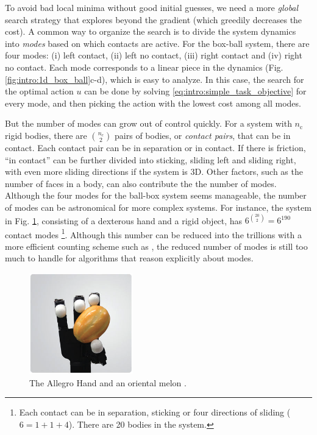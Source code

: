 To avoid bad local minima without good initial guesses, we need a more \emph{global} search strategy that explores beyond the gradient (which greedily decreases the cost). A common way to organize the search is to divide the system dynamics into \emph{modes} based on which contacts are active. For the box-ball system, there are four modes: (i) left contact, (ii) left no contact, (iii) right contact and (iv) right no contact. Each mode corresponds to a linear piece in the dynamics (Fig. \ref{fig:intro:1d_box_ball}c-d), which is easy to analyze. In this case, the search for the optimal action $u$ can be done by solving \eqref{eq:intro:simple_task_objective} for every mode, and then picking the action with the lowest cost among all modes.

But the number of modes can grow out of control quickly. For a system with $n_\mathrm{c}$ rigid bodies, there are $\binom{n_c}{2}$ pairs of bodies, or \emph{contact pairs}, that can be in contact. Each contact pair can be in separation or in contact. If there is friction, ``in contact'' can be further divided into sticking, sliding left and sliding right, with even more sliding directions if the system is 3D. Other factors, such as the number of faces in a body, can also contribute the the number of modes. Although the four modes for the ball-box system seems manageable, the number of modes can be astronomical for more complex systems. For instance, the system in Fig. \ref{fig:intro:allegro_hand_and_melon}, consisting of a dexterous hand and a rigid object, has $6^{\binom{20}{2}} = 6^{190}$ contact modes \footnote{Each contact can be in separation, sticking or four directions of sliding ($6 = 1 + 1 + 4$). There are 20 bodies in the system.}. Although this number can be reduced into the trillions with a more efficient counting scheme such as \cite{huang2021efficient}, the reduced number of modes is still too much to handle for algorithms that reason explicitly about modes.

\begin{figure}
\centering\includegraphics[width = 0.40\textwidth]{figures/01_intro/allegro_hand_and_melon.png}
\caption{The Allegro Hand and an oriental melon \cite{allegrohand}.}
\label{fig:intro:allegro_hand_and_melon}
\end{figure}


